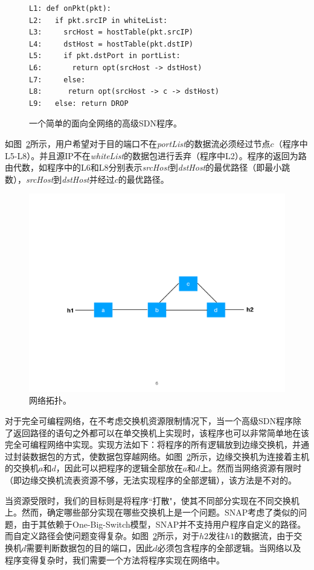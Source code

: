 \begin{figure}[h]
\begin{verbatim}
L1: def onPkt(pkt):
L2:   if pkt.srcIP in whiteList:
L3:     srcHost = hostTable(pkt.srcIP)
L4:     dstHost = hostTable(pkt.dstIP)
L5:     if pkt.dstPort in portList:
L6:       return opt(srcHost -> dstHost)
L7:     else:
L8:      return opt(srcHost -> c -> dstHost)
L9:   else: return DROP
\end{verbatim}
    \caption{\small 一个简单的面向全网络的高级SDN程序。}
\label{fig:code1}
\end{figure}

如图~\ref{fig:topo1}所示，用户希望对于目的端口不在\emph{portList}的数据流必须经过节点$c$（程序中L5-L8）。并且源IP不在\emph{whiteList}的数据包进行丢弃（程序中L2）。程序的返回为路由代数，如程序中的L6和L8分别表示\emph{srcHost}到\emph{dstHost}的最优路径（即最小跳数），\emph{srcHost}到\emph{dstHost}并经过$c$的最优路径。

\begin{figure}[!htbp]
\includegraphics[width=0.8\linewidth]{figures/global-topo.pdf}
\centering
\caption{\small 网络拓扑。}
\label{fig:topo1}
\end{figure}

对于完全可编程网络，在不考虑交换机资源限制情况下，当一个高级SDN程序除了返回路径的语句之外都可以在单交换机上实现时，该程序也可以非常简单地在该完全可编程网络中实现。实现方法如下：将程序的所有逻辑放到边缘交换机，并通过封装数据包的方式，使数据包穿越网络。如图~\ref{fig:topo1}所示，边缘交换机为连接着主机的交换机$a$和$d$，因此可以把程序的逻辑全部放在$a$和$d$上。然而当网络资源有限时（即边缘交换机流表资源不够，无法实现程序的全部逻辑），该方法是不对的。

当资源受限时，我们的目标则是将程序``打散"，使其不同部分实现在不同交换机上。然而，确定哪些部分实现在哪些交换机上是一个问题。SNAP考虑了类似的问题，由于其依赖于One-Big-Switch模型，SNAP并不支持用户程序自定义的路径。而自定义路径会使问题变得复杂。如图~\ref{fig:topo1}所示，对于$h2$发往$h1$的数据流，由于交换机$d$需要判断数据包的目的端口，因此$d$必须包含程序的全部逻辑。当网络以及程序变得复杂时，我们需要一个方法将程序实现在网络中。



